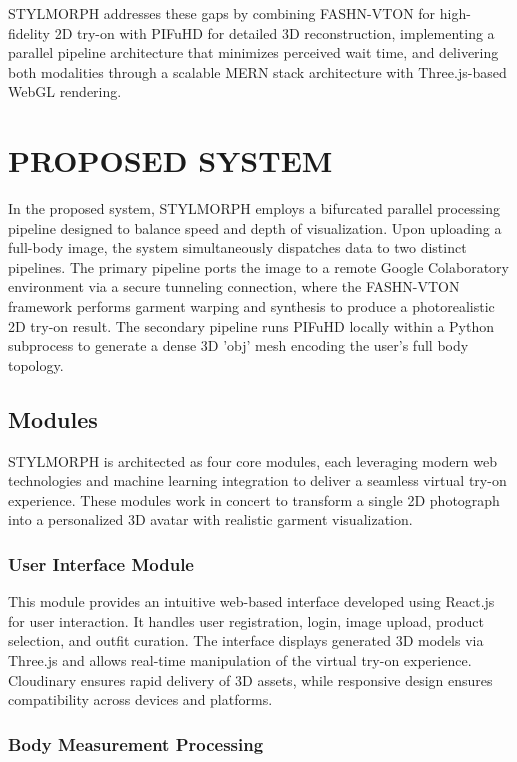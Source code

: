 \documentclass[12pt,a4paper,oneside]{report}
\begin{document}
STYLMORPH addresses these gaps by combining FASHN-VTON for high-fidelity 2D try-on with PIFuHD for detailed 3D reconstruction, implementing a parallel pipeline architecture that minimizes perceived wait time, and delivering both modalities through a scalable MERN stack architecture with Three.js-based WebGL rendering.

\chapter{PROPOSED SYSTEM}

In the proposed system, STYLMORPH employs a bifurcated parallel processing pipeline designed to balance speed and depth of visualization. Upon uploading a full-body image, the system simultaneously dispatches data to two distinct pipelines. The primary pipeline ports the image to a remote Google Colaboratory environment via a secure tunneling connection, where the FASHN-VTON framework performs garment warping and synthesis to produce a photorealistic 2D try-on result. The secondary pipeline runs PIFuHD locally within a Python subprocess to generate a dense 3D 'obj' mesh encoding the user's full body topology.

\section{Modules}

STYLMORPH is architected as four core modules, each leveraging modern web technologies and machine learning integration to deliver a seamless virtual try-on experience. These modules work in concert to transform a single 2D photograph into a personalized 3D avatar with realistic garment visualization.

\subsection{User Interface Module}

This module provides an intuitive web-based interface developed using React.js for user interaction. It handles user registration, login, image upload, product selection, and outfit curation. The interface displays generated 3D models via Three.js and allows real-time manipulation of the virtual try-on experience. Cloudinary ensures rapid delivery of 3D assets, while responsive design ensures compatibility across devices and platforms.

\subsection{Body Measurement Processing}
\end{document}
